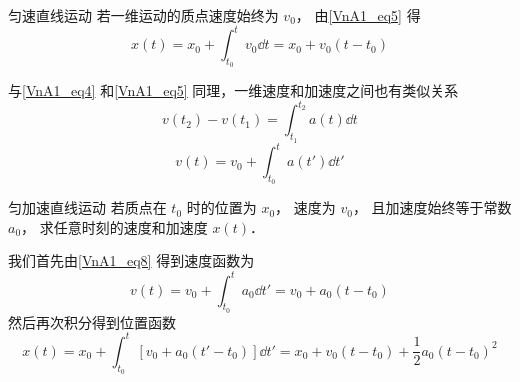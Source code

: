 \begin{example}{匀速直线运动}
若一维运动的质点速度始终为 $v_0$， 由\autoref{VnA1_eq5} 得
\begin{equation}
x(t) = x_0 + \int_{t_0}^t v_0 \dd{t} = x_0 + v_0(t-t_0)
\end{equation}
\end{example}

与\autoref{VnA1_eq4} 和\autoref{VnA1_eq5} 同理，一维速度和加速度之间也有类似关系
\begin{equation}
v(t_2) - v(t_1) = \int_{t_1}^{t_2} a(t) \dd{t}
\end{equation}
\begin{equation}\label{VnA1_eq8}
v(t) = v_0 + \int_{t_0}^t a(t') \dd{t'}
\end{equation}

\begin{example}{匀加速直线运动}
若质点在 $t_0$ 时的位置为 $x_0$， 速度为 $v_0$， 且加速度始终等于常数 $a_0$， 求任意时刻的速度和加速度 $x(t)$．

我们首先由\autoref{VnA1_eq8} 得到速度函数为
\begin{equation}
v(t) = v_0 + \int_{t_0}^t a_0 \dd{t'} = v_0 + a_0 (t - t_0)
\end{equation}
然后再次积分得到位置函数
\begin{equation}
x(t) = x_0 + \int_{t_0}^t [v_0 + a_0 (t' - t_0)] \dd{t'} = x_0 + v_0 (t - t_0) +  \frac12 a_0 (t - t_0)^2
\end{equation}
\end{example}
